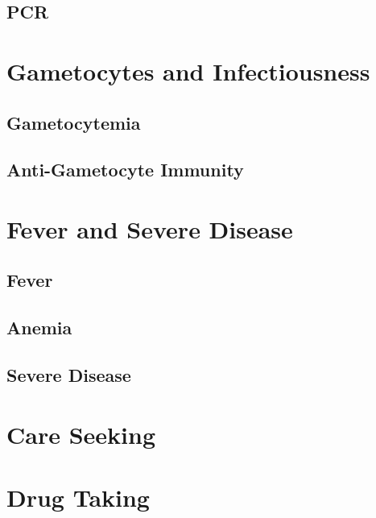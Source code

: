 \documentclass[
]{book}
\begin{document}
\hypertarget{pcr}{%
\section{PCR}\label{pcr}}

\hypertarget{gametocytes-and-infectiousness-1}{%
\chapter{Gametocytes and Infectiousness}\label{gametocytes-and-infectiousness-1}}

\hypertarget{gametocytemia}{%
\section{Gametocytemia}\label{gametocytemia}}

\hypertarget{anti-gametocyte-immunity}{%
\section{Anti-Gametocyte Immunity}\label{anti-gametocyte-immunity}}

\hypertarget{fever-and-severe-disease}{%
\chapter{Fever and Severe Disease}\label{fever-and-severe-disease}}

\hypertarget{fever}{%
\section{Fever}\label{fever}}

\hypertarget{anemia}{%
\section{Anemia}\label{anemia}}

\hypertarget{severe-disease}{%
\section{Severe Disease}\label{severe-disease}}

\hypertarget{care-seeking}{%
\chapter{Care Seeking}\label{care-seeking}}

\hypertarget{drug-taking-1}{%
\chapter{Drug Taking}\label{drug-taking-1}}
\end{document}
